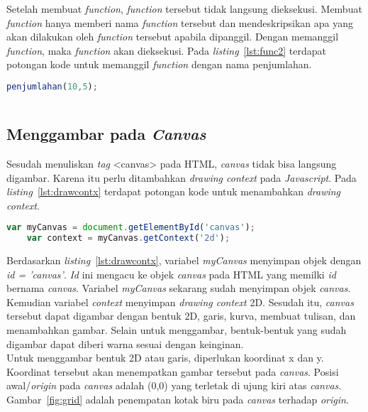 Setelah membuat \textit{function}, \textit{function} tersebut tidak langsung dieksekusi. Membuat \textit{function} hanya memberi nama \textit{function} tersebut dan mendeskripsikan apa yang akan dilakukan oleh \textit{function} tersebut apabila dipanggil. Dengan memanggil \textit{function}, maka \textit{function} akan dieksekusi. Pada \textit{listing}~\ref{lst:func2} terdapat potongan kode untuk memanggil \textit{function} dengan nama penjumlahan.

\begin{lstlisting}[language=Javascript, caption=Memanggil \textit{function} penjumlahan, label={lst:func2}]
	penjumlahan(10,5);
	
\end{lstlisting}

\subsection{Menggambar pada \textit{Canvas}}
Sesudah menuliskan \textit{tag} <canvas> pada HTML, \textit{canvas} tidak bisa langsung digambar. Karena itu perlu ditambahkan \textit{drawing context} pada \textit{Javascript}. Pada \textit{listing}~\ref{lst:drawcontx} terdapat potongan kode untuk menambahkan \textit{drawing context}.

\begin{lstlisting}[language=Javascript, caption=Menambahkan \textit{drawing context canvas}, label={lst:drawcontx} ]
	var myCanvas = document.getElementById('canvas');
	var context = myCanvas.getContext('2d');
\end{lstlisting}

Berdasarkan \textit{listing}~\ref{lst:drawcontx}, variabel \textit{myCanvas} menyimpan objek dengan \textit{id = 'canvas'}. \textit{Id} ini mengacu ke objek \textit{canvas} pada HTML yang memilki \textit{id} bernama \textit{canvas}. Variabel \textit{myCanvas} sekarang sudah menyimpan objek \textit{canvas}. Kemudian variabel \textit{context} menyimpan \textit{drawing context} 2D. Sesudah itu, \textit{canvas} tersebut dapat digambar dengan bentuk 2D, garis, kurva, membuat tulisan, dan menambahkan gambar. Selain untuk menggambar, bentuk-bentuk yang sudah digambar dapat diberi warna sesuai dengan keinginan.\\

Untuk menggambar bentuk 2D atau garis, diperlukan koordinat x dan y. Koordinat tersebut akan menempatkan gambar tersebut pada \textit{canvas}. Posisi awal/\textit{origin} pada \textit{canvas} adalah (0,0) yang terletak di ujung kiri atas \textit{canvas}. Gambar~\ref{fig:grid} adalah penempatan kotak biru pada \textit{canvas} terhadap \textit{origin}.

